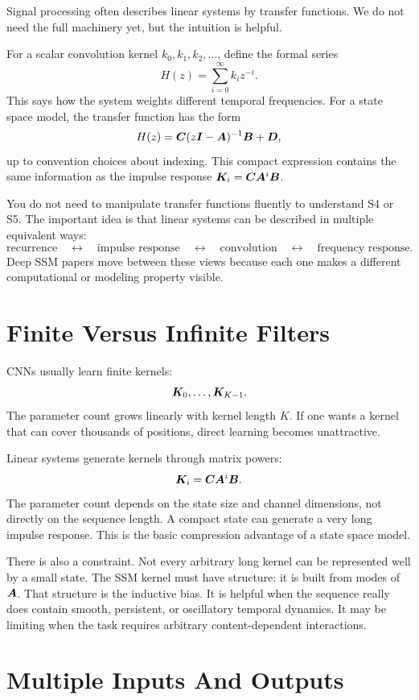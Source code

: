 Signal processing often describes linear systems by transfer functions. We do not need
the full machinery yet, but the intuition is helpful.

For a scalar convolution kernel $k_0,k_1,k_2,\ldots$, define the formal series
\[
  H(z) = \sum_{i=0}^{\infty} k_i z^{-i}.
\]
This says how the system weights different temporal frequencies. For a state space model,
the transfer function has the form
\[
  H(z)
  =
  \bm{C} (z\bm{I} - \bm{A})^{-1} \bm{B} + \bm{D},
\]
up to convention choices about indexing. This compact expression contains the same
information as the impulse response $\bm{K}_i = \bm{C}\bm{A}^i\bm{B}$.

You do not need to manipulate transfer functions fluently to understand S4 or S5. The
important idea is that linear systems can be described in multiple equivalent ways:
\[
  \text{recurrence}
  \quad \leftrightarrow \quad
  \text{impulse response}
  \quad \leftrightarrow \quad
  \text{convolution}
  \quad \leftrightarrow \quad
  \text{frequency response}.
\]
Deep SSM papers move between these views because each one makes a different computational
or modeling property visible.

\section{Finite Versus Infinite Filters}

CNNs usually learn finite kernels:
\[
  \bm{K}_0,\ldots,\bm{K}_{K-1}.
\]
The parameter count grows linearly with kernel length $K$. If one wants a kernel that
can cover thousands of positions, direct learning becomes unattractive.

Linear systems generate kernels through matrix powers:
\[
  \bm{K}_i = \bm{C}\bm{A}^i\bm{B}.
\]
The parameter count depends on the state size and channel dimensions, not directly on the
sequence length. A compact state can generate a very long impulse response. This is the
basic compression advantage of a state space model.

There is also a constraint. Not every arbitrary long kernel can be represented well by a
small state. The SSM kernel must have structure: it is built from modes of $\bm{A}$. That
structure is the inductive bias. It is helpful when the sequence really does contain
smooth, persistent, or oscillatory temporal dynamics. It may be limiting when the task
requires arbitrary content-dependent interactions.

\section{Multiple Inputs And Outputs}

